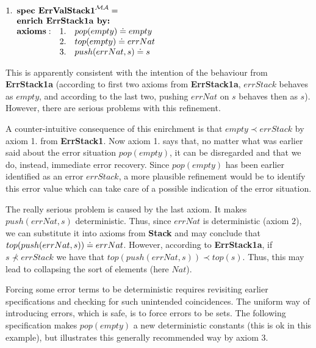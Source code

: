 \documentclass[10pt]{article}
\begin{document}
\(
1. \spec{	\tit{\mbox{\bf spec\ ErrValStack1}^{\inst{MA}}=} \\
	\tit{\mbox{\bf enrich\ ErrStack1a\  by:}} \\
	 	{\bf axioms:}
			&1.& pop(empty) \eleq empty \\
			&2.& top(empty) \eleq errNat \\
			&3.& push(errNat,s) \eleq s
}
\) 

\noindent
This is apparently consistent with the intention of the
behaviour from {\bf ErrStack1a} (according to first two axioms from {\bf
ErrStack1a}, $errStack$ behaves as $empty$, and according to the last two,
pushing $errNat$ on $s$ behaves then as $s$). However, there are serious
problems with this refinement.

A counter-intuitive consequence of this enirchment is that $empty\prec
errStack$ by axiom 1. from {\bf ErrStack1}. Now axiom 1. says that, no
matter what was earlier said about the error si\-tu\-at\-ion $pop(empty)$, it
can be disregarded and that we do, instead, immediate error recovery. 
Since $pop(empty)$ has been earlier
identified as an error $errStack$, a more plausible refinement would be to
identify this
error value which can take care of a possible indication of the error
situation.


The really serious problem is caused by the last axiom. It makes $push(errNat,s)$
deterministic. Thus, since $errNat$ is deterministic (axiom 2), we can substitute it into
axioms from {\bf Stack} and may conclude that
$top(push(errNat,s))\mathrel{\dot{=} } errNat$. However, according to  {\bf ErrStack1a},
if $s\not\prec errStack$ we have that $top(push(errNat,s))\prec
top(s)$. Thus, this may lead to collapsing the sort of elements (here $Nat$).

Forcing some error terms to be deterministic requires revisiting
earlier specifications and checking for such unintended
coincidences. The uniform way of introducing errors, which is safe, is to
force errors to be sets. The following specification makes $pop(empty)$ a new
deterministic constants (this is ok in this example), but illustrates this
generally recommended way by axiom 3.
\end{document}
